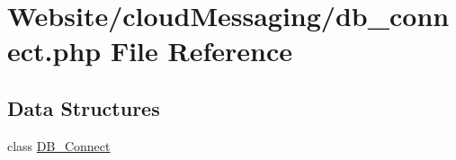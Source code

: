 \hypertarget{db__connect_8php}{\section{Website/cloud\-Messaging/db\-\_\-connect.php File Reference}
\label{db__connect_8php}
}
\subsection*{Data Structures}
\begin{DoxyCompactItemize}
\item 
class \hyperlink{class_d_b___connect}{D\-B\-\_\-\-Connect}
\end{DoxyCompactItemize}
